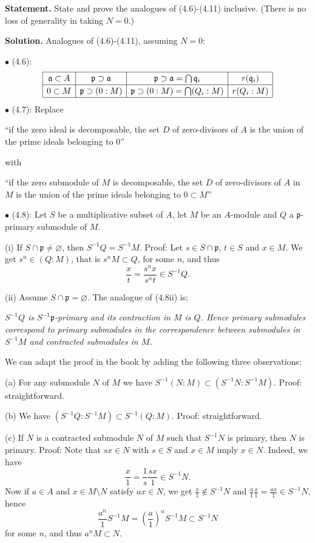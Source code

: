 \documentclass[12pt,letterpaper]{article}%
\newcommand{\mf}{\mathfrak}
\newcommand{\aaa}{\mf a}
\newcommand{\ppp}{\mf p}
\newcommand{\qqq}{\mf q}
\newcommand{\bu}{\bullet}
\newcommand{\nn}{\noindent}
\begin{document}
\textbf{Statement.} State and prove the analogues of (4.6)-(4.11) inclusive. (There is no loss of generality in taking $N=0$.)

\nn\textbf{Solution.} Analogues of (4.6)-(4.11), assuming $N=0$: 

\nn$\bu$ (4.6): 
$$
{\renewcommand{\arraystretch}{1.2}%
\begin{array}{|c|c|c|c|}\hline
\aaa\subset A&\ppp\supset\aaa&\ppp\supset\aaa=\bigcap\qqq_i&r(\qqq_i)\\ \hline 
0\subset M&\ppp\supset(0:M)&\ppp\supset(0:M)=\bigcap(Q_i:M)&r(Q_i:M)\\ \hline
\end{array}}
$$ 
$\bu$ (4.7): Replace 

``if the zero ideal is decomposable, the set $D$ of zero-divisors of $A$ is the union of the prime ideals belonging to $0$'' 

\nn with 

``if the zero submodule of $M$ is decomposable, the set $D$ of zero-divisors of $A$ in $M$ is the union of the prime ideals belonging to $0\subset M$''

\nn$\bu$ (4.8): Let $S$ be a multiplicative subset of $A$, let $M$ be an $A$-module and $Q$ a $\ppp$-primary submodule of $M$. 

(i) If $S\cap\ppp\ne\varnothing$, then $S^{-1}Q=S^{-1}M$. Proof: Let $s\in S\cap\ppp$, $t\in S$ and $x\in M$. We get $s^n\in(Q:M)$, that is $s^nM\subset Q$, for some $n$, and thus 
$$
\frac xt=\frac{s^nx}{s^nt}\in S^{-1}Q.
$$ 

(ii) Assume $S\cap\ppp=\varnothing$. The analogue of (4.8ii) is: 

\nn\emph{$S^{-1}Q$ is $S^{-1}\ppp$-primary and its contraction in $M$ is $Q$. Hence primary submodules correspond to primary submodules in the correspondence between submodules in $S^{-1}M$ and contracted submodules in $M$.} 

We can adapt the proof in the book by adding the following three observations: 

(a) For any submodule $N$ of $M$ we have $S^{-1}(N:M)\subset(S^{-1}N:S^{-1}M)$. Proof: straightforward. 

(b) We have $(S^{-1}Q:S^{-1}M)\subset S^{-1}(Q:M)$. Proof: straightforward. 

(c) If $N$ is a contracted submodule $N$ of $M$ such that $S^{-1}N$ is primary, then $N$ is primary. Proof: Note that $sx\in N$ with $s\in S$ and $x\in M$ imply $x\in N$. Indeed, we have 
$$
\frac x1=\frac 1s\frac{sx}1\in S^{-1}N.
$$ 
Now if $a\in A$ and $x\in M\setminus N$ satisfy $ax\in N$, we get $\frac x1\notin S^{-1}N$ and $\frac a1\frac x1=\frac{ax}1\in S^{-1}N$, hence 
$$
\frac{a^n}1S^{-1}M=\left(\frac a1\right)^nS^{-1}M\subset S^{-1}N
$$ 
for some $n$, and thus $a^nM\subset N$. 
\end{document}
